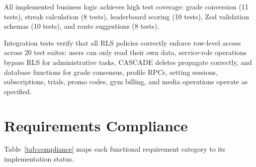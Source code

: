 \documentclass[12pt,a4paper]{report}
\renewcommand\_{\textunderscore\hspace{0pt}}
\begin{document}

All implemented business logic achieves high test coverage: grade conversion (11 tests), streak calculation (8 tests), leaderboard scoring (10 tests), Zod validation schemas (10 tests), and route suggestions (8 tests).

Integration tests verify that all RLS policies correctly enforce row-level access across 20 test suites: users can only read their own data, service-role operations bypass RLS for administrative tasks, CASCADE deletes propagate correctly, and database functions for grade consensus, profile RPCs, setting sessions, subscriptions, trials, promo codes, gym billing, and media operations operate as specified.

\section{Requirements Compliance}

Table~\ref{tab:compliance} maps each functional requirement category to its implementation status.
\end{document}

